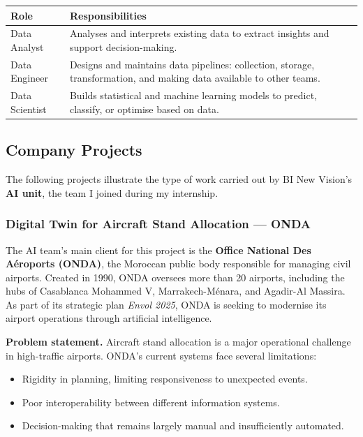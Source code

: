 \documentclass[12pt, a4paper]{article}
\begin{document}
\vspace{0.5em}
\begin{tabularx}{\textwidth}{lX}
\toprule
\textbf{Role} & \textbf{Responsibilities} \\
\midrule
Data Analyst    & Analyses and interprets existing data to extract insights and support decision-making. \\
\addlinespace
Data Engineer   & Designs and maintains data pipelines: collection, storage, transformation, and making data available to other teams. \\
\addlinespace
Data Scientist  & Builds statistical and machine learning models to predict, classify, or optimise based on data. \\
\bottomrule
\end{tabularx}

\vspace{1em}

\subsection{Company Projects}

The following projects illustrate the type of work carried out by BI New Vision's \textbf{AI unit}, the team I joined during my internship.

\subsubsection*{Digital Twin for Aircraft Stand Allocation --- ONDA}

The AI team's main client for this project is the \textbf{Office National Des Aéroports (ONDA)}, the Moroccan public body responsible for managing civil airports. Created in 1990, ONDA oversees more than 20 airports, including the hubs of Casablanca Mohammed V, Marrakech-Ménara, and Agadir-Al Massira. As part of its strategic plan \textit{Envol 2025}, ONDA is seeking to modernise its airport operations through artificial intelligence.

\textbf{Problem statement.} Aircraft stand allocation is a major operational challenge in high-traffic airports. ONDA's current systems face several limitations:

\begin{itemize}
  \item Rigidity in planning, limiting responsiveness to unexpected events.
  \item Poor interoperability between different information systems.
  \item Decision-making that remains largely manual and insufficiently automated.
\end{itemize}
\end{document}
